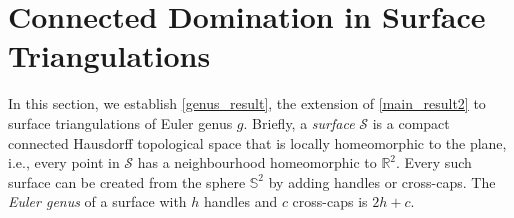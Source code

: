 \documentclass{patmorin}
\newcommand{\defin}[1]{\emph{\textcolor{brightmaroon}{#1}}}
\begin{document}

\section{Connected Domination in Surface Triangulations}
\label{bounded_genus}

In this section, we establish \cref{genus_result}, the extension of \cref{main_result2} to surface triangulations of Euler genus $g$.
Briefly, a \defin{surface} $\mathcal{S}$ is a compact connected Hausdorff topological space that is locally homeomorphic to the plane, i.e., every point in $\mathcal{S}$ has a neighbourhood homeomorphic to $\mathbb{R}^2$. Every such surface can be created from the sphere $\mathbb{S}^2$ by adding handles or cross-caps. The \defin{Euler genus} of a surface with $h$ handles and $c$ cross-caps is $2h+c$.
\end{document}
